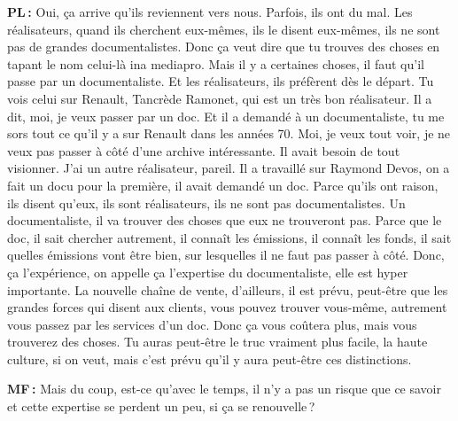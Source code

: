 \textbf{PL :} Oui, ça arrive qu'ils reviennent vers nous. Parfois, ils ont du mal. Les réalisateurs, quand ils cherchent eux-mêmes, ils le disent eux-mêmes, ils ne sont pas de grandes documentalistes.  Donc ça veut dire que tu trouves des choses en tapant le nom celui-là ina mediapro. Mais il y a certaines choses, il faut qu'il passe par un documentaliste. Et les réalisateurs, ils préfèrent dès le départ. Tu vois celui sur Renault, Tancrède Ramonet, qui est un très bon réalisateur. Il a dit, moi, je veux passer par un doc. Et il a demandé à un documentaliste, tu me sors tout ce qu'il y a sur Renault dans les années 70. Moi, je veux tout voir, je ne veux pas passer à côté d'une archive intéressante. Il avait besoin de tout visionner. J'ai un autre réalisateur, pareil. Il a travaillé sur Raymond Devos, on a fait un docu pour la première, il avait demandé un doc.  Parce qu'ils ont raison, ils disent qu'eux, ils sont réalisateurs, ils ne sont pas documentalistes.  Un documentaliste, il va trouver des choses que eux ne trouveront pas. Parce que le doc, il sait chercher autrement, il connaît les émissions, il connaît les fonds, il sait quelles émissions vont être bien, sur lesquelles il ne faut pas passer à côté. Donc, ça l'expérience, on appelle ça l'expertise du documentaliste, elle est hyper importante. La nouvelle chaîne de vente, d'ailleurs, il est prévu, peut-être que les grandes forces qui disent aux clients, vous pouvez trouver vous-même, autrement vous passez par les services d’un doc. Donc ça vous coûtera plus, mais vous trouverez des choses. Tu auras peut-être le truc vraiment plus facile, la haute culture, si on veut, mais c'est prévu qu'il y aura peut-être ces distinctions.  

\textbf{MF :} Mais du coup, est-ce qu'avec le temps, il n'y a pas un risque que ce savoir et cette expertise se perdent un peu, si ça se renouvelle ? 


